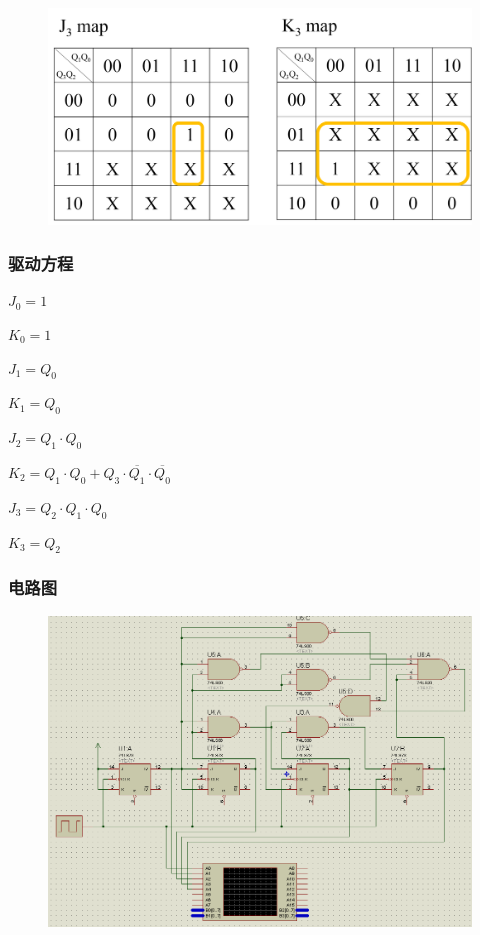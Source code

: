 \documentclass{article}
\begin{document}
\begin{figure}[!hbp]
  \centering
  \includegraphics[scale=0.5]{4/k4.png}
\end{figure}

\newpage

\subsubsection{驱动方程}

$J_0 = 1$

$K_0 = 1$

$J_1 = Q_0$

$K_1 = Q_0$

$J_2 = Q_1 \cdot Q_0$

$K_2 = Q_1 \cdot Q_0 + Q_3 \cdot \overline{Q_1} \cdot \overline{Q_0}$

$J_3 = Q_2 \cdot Q_1 \cdot Q_0$

$K_3 = Q_2$

\subsubsection{电路图}

\begin{figure}[!hbp]
  \centering
  \includegraphics[scale=0.4]{4/1.png}
\end{figure}
\end{document}
